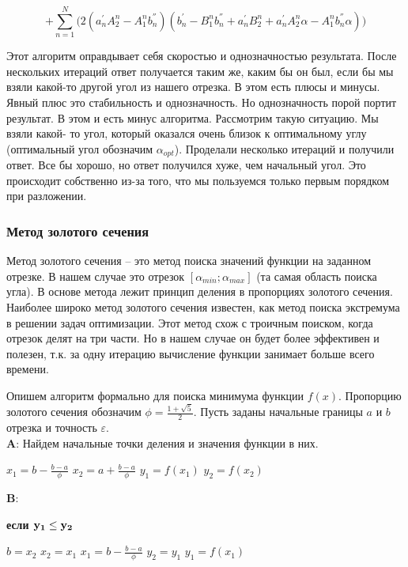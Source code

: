 \documentclass[a4paper,12pt, titlepage]{article}
\begin{document}
$$
+ \sum \limits_{n=1}^{N}
	\Biggl(
		2(a^{'}_{n}A^{n}_{2} - A^{n}_{1}b^{''}_{n})
			(b^{'}_{n} - B^{n}_{1}b^{''}_{n} + a^{'}_{n}B^{n}_{2} + a^{'}_{n}A^{n}_{2}\alpha - A^{n}_{1}b^{''}_{n}\alpha)
	\Biggr)
$$

Этот алгоритм оправдывает себя скоростью и однозначностью результата. После нескольких итераций ответ получается таким же, каким 
бы он был, если бы мы взяли какой-то другой угол из нашего отрезка. В этом есть плюсы и минусы. Явный плюс это стабильность и 
однозначность. Но однозначность порой портит результат. В этом и есть минус алгоритма. Рассмотрим такую ситуацию. Мы взяли какой-
то угол, который оказался очень близок к  оптимальному углу (оптимальный угол обозначим $\alpha_{opt}$). Проделали несколько 
итераций и получили ответ. Все бы хорошо, но ответ получился хуже, чем начальный угол. Это происходит собственно из-за того, что 
мы пользуемся только первым порядком при разложении.

\subsubsection{Метод золотого сечения}
Метод золотого сечения -- это метод поиска значений  функции на заданном отрезке. В нашем случае это 
отрезок  $[ {\alpha}_{min};{\alpha}_{max} ]$
(та самая область поиска угла). В основе метода лежит принцип деления в пропорциях золотого сечения. Наиболее широко метод 
золотого сечения известен, как метод поиска экстремума в решении задач оптимизации. Этот метод схож с троичным поиском, когда 
отрезок делят на три 
части. Но в нашем случае он будет более эффективен  и полезен, т.к. за одну итерацию вычисление функции занимает больше всего 
времени.

Опишем алгоритм формально для поиска минимума функции $f(x)$. 
Пропорцию золотого сечения обозначим $\phi = \frac{1+\sqrt{5}}{2}$. 
Пусть заданы начальные границы $a$ и $b$ отрезка  и точность $\varepsilon$.\\
{\bf A}: Найдем начальные точки деления и значения функции в них.
\begin{center} 
${x}_{1} = b - \frac{b-a}{\phi}$\qquad                
${x}_{2} = a + \frac{b-a}{\phi}$\qquad
${y}_{1} = f({x}_{1})$\qquad
${y}_{2} = f({x}_{2})$
\end{center}
{\bf B}:	  

{\bf   если $\bf {y}_{1} \le {y}_{2}$}
\begin{center} 
$b = {x}_{2}$\qquad                
${x}_{2} = {x}_{1}$\qquad
${x}_{1} = b - \frac{b-a}{\phi}$\qquad
${y}_{2} = {y}_{1}$\qquad
${y}_{1} = f({x}_{1})$
\end{center}
\end{document}
